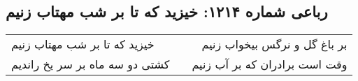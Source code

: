 \begin{center}
\section*{رباعی شماره ۱۲۱۴: خیزید که تا بر شب مهتاب زنیم}
\label{sec:1214}
\begin{longtable}{l p{0.5cm} r}
خیزید که تا بر شب مهتاب زنیم
&&
بر باغ گل و نرگس بیخواب زنیم
\\
کشتی دو سه ماه بر سر یخ راندیم
&&
وقت است برادران که بر آب زنیم
\\
\end{longtable}
\end{center}
